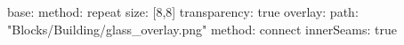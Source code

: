 base:
  method: repeat
  size: [8,8]
  transparency: true
overlay:
  path: "Blocks/Building/glass_overlay.png"
  method: connect
  innerSeams: true